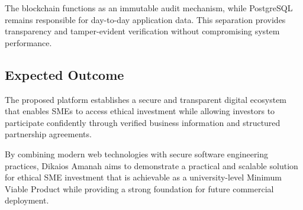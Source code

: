 The blockchain functions as an immutable audit mechanism, while PostgreSQL remains responsible for day-to-day application data. This separation provides transparency and tamper-evident verification without compromising system performance.


\subsection{Expected Outcome}

The proposed platform establishes a secure and transparent digital ecosystem that enables SMEs to access ethical investment while allowing investors to participate confidently through verified business information and structured partnership agreements.

By combining modern web technologies with secure software engineering practices, Dikaios Amanah aims to demonstrate a practical and scalable solution for ethical SME investment that is achievable as a university-level Minimum Viable Product while providing a strong foundation for future commercial deployment.
